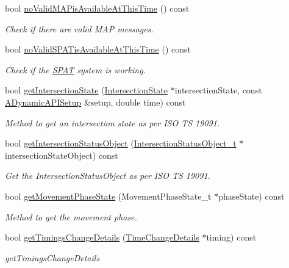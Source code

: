 \begin{DoxyCompactItemize}
bool \hyperlink{classV2XIntersection_ac7e89d7f3e67a8984de48343295db714}{no\+Valid\+M\+A\+Pis\+Available\+At\+This\+Time} () const 
\begin{DoxyCompactList}\small\item\em Check if there are valid M\+AP messages. \end{DoxyCompactList}\item 
bool \hyperlink{classV2XIntersection_ae0aaeafa1cf9e8f6704d393a2cc254e5}{no\+Valid\+S\+P\+A\+Tis\+Available\+At\+This\+Time} () const 
\begin{DoxyCompactList}\small\item\em Check if the \hyperlink{structSPAT}{S\+P\+AT} system is working. \end{DoxyCompactList}\item 
bool \hyperlink{classV2XIntersection_a504d6e4f88262feee79f4f66332b7b5d}{get\+Intersection\+State} (\hyperlink{structIntersectionState}{Intersection\+State} $\ast$intersection\+State, const \hyperlink{classADynamicAPISetup}{A\+Dynamic\+A\+P\+I\+Setup} \&setup, double time) const 
\begin{DoxyCompactList}\small\item\em Method to get an intersection state as per I\+SO TS 19091. \end{DoxyCompactList}\item 
bool \hyperlink{classV2XIntersection_af23a34f08972950e247eb38726f17548}{get\+Intersection\+Status\+Object} (\hyperlink{structBIT__STRING__s}{Intersection\+Status\+Object\+\_\+t} $\ast$intersection\+State\+Object) const 
\begin{DoxyCompactList}\small\item\em Get the Intersection\+Status\+Object as per I\+SO TS 19091. \end{DoxyCompactList}\item 
bool \hyperlink{classV2XIntersection_a8e8645c541204b239f15c6195c66cdee}{get\+Movement\+Phase\+State} (Movement\+Phase\+State\+\_\+t $\ast$phase\+State) const 
\begin{DoxyCompactList}\small\item\em Method to get the movement phase. \end{DoxyCompactList}\item 
bool \hyperlink{classV2XIntersection_a98eeb9be7e3e2e64cb79fd292379ae7a}{get\+Timings\+Change\+Details} (\hyperlink{structTimeChangeDetails}{Time\+Change\+Details} $\ast$timing) const 
\begin{DoxyCompactList}\small\item\em get\+Timings\+Change\+Details \end{DoxyCompactList}\item 

\end{DoxyCompactItemize}
